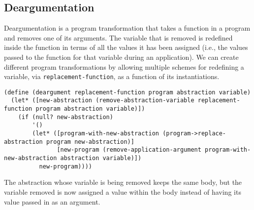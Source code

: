 \documentclass[a4paper,10pt]{article}
\begin{document}
\subsection{Deargumentation}
Deargumentation is a program transformation that takes a function in a program and removes one of its arguments.  The variable that is removed is redefined inside the function in terms of all the values it has been assigned (i.e., the values passed to the function for that variable during an application).  We can create different program transformations by allowing multiple schemes for redefining a variable, via \texttt{replacement-function},  as a function of its instantiations.  
\begin{lstlisting}[frame=trbl]
(define (deargument replacement-function program abstraction variable)
  (let* ([new-abstraction (remove-abstraction-variable replacement-function program abstraction variable)])
    (if (null? new-abstraction)
        '()
        (let* ([program-with-new-abstraction (program->replace-abstraction program new-abstraction)]
               [new-program (remove-application-argument program-with-new-abstraction abstraction variable)])
          new-program))))
\end{lstlisting}
The abstraction whose variable is being removed keeps the same body, but the variable removed is now assigned a value  within the body instead of having its value passed in as an argument.
\end{document}
